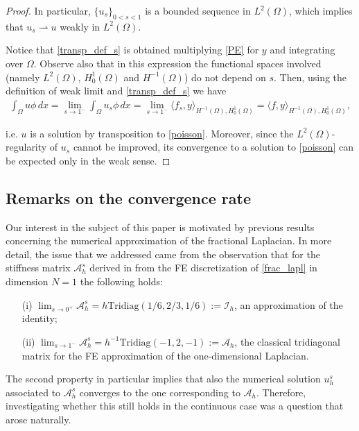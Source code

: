 \documentclass[reqno,twoside]{amsart}
\numberwithin{equation}{section}
\begin{document}
\begin{proof}
{In particular, $\{u_s\}_{0<s<1}$ is a bounded sequence in $L^2(\Omega)$, which implies that $u_s\rightharpoonup u$ weakly in $L^2(\Omega)$.

Notice that \eqref{transp_def_s} is obtained multiplying \eqref{PE} for $y$ and integrating over $\Omega$. Observe also that in this expression the functional spaces involved (namely $L^2(\Omega)$, $H_0^1(\Omega)$ and $H^{-1}(\Omega)$) do not depend on $s$. Then, using the definition of weak limit and \eqref{transp_def_s} we have 
\begin{align*}
	\int_\Omega u\phi\,dx = \lim_{s\to 1^-}\int_\Omega u_s\phi\,dx = \lim_{s\to 1^-} \langle f_s,y\rangle_{H^{-1}(\Omega),H_0^1(\Omega)} = \langle f,y\rangle_{H^{-1}(\Omega),H_0^1(\Omega)},
\end{align*}
}
i.e. $u$ is a solution by transposition to \eqref{poisson}. Moreover, since the $L^2(\Omega)$-regularity of $u_s$ cannot be improved, its convergence to a solution to \eqref{poisson} can be expected only in the weak sense.
\end{proof}

\subsection{Remarks on the convergence rate}

Our interest in the subject of this paper is motivated by previous results concerning the numerical approximation of the fractional Laplacian. In more detail, the issue that we addressed came from the observation that for the stiffness matrix $\mathcal A_h^s$ derived in \cite{biccari2017controllability} from the FE discretization of \eqref{frac_lapl} in dimension $N=1$  the following holds:
\begin{itemize}
	\item[(i)] $\lim_{s\to 0^+}\mathcal A_h^s = h\textrm{Tridiag}(1/6,2/3,1/6):=\mathcal I_h$, an approximation of the identity;
	
	\item[(ii)] $\lim_{s\to 1^-}\mathcal A_h^s = h^{-1}\textrm{Tridiag}(-1,2,-1):=\mathcal A_h$, the classical tridiagonal matrix for the FE approximation of the one-dimensional Laplacian.
\end{itemize}

The second property in particular implies that also the numerical solution $u_h^s$ associated to $\mathcal A_h^s$ converges to the one corresponding to $\mathcal A_h$. Therefore, investigating whether this still holds in the continuous case was a question that arose naturally. 
\end{document}
